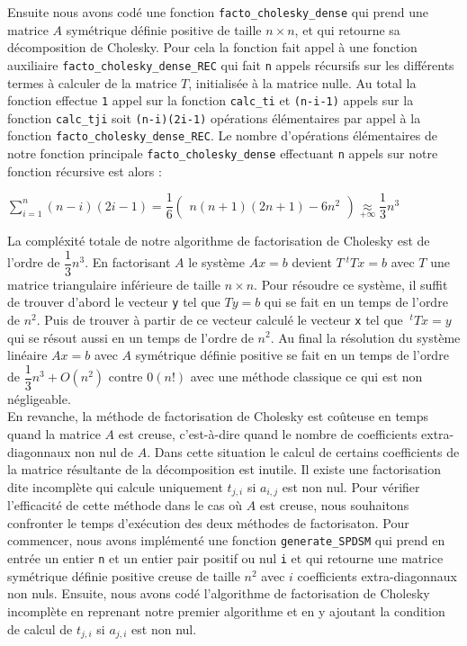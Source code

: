 \documentclass{article}
\begin{document}
Ensuite nous avons codé une fonction \texttt{facto\_cholesky\_dense} qui prend une matrice $A$ symétrique définie positive de taille $n\times n$, et qui retourne sa décomposition de Cholesky. Pour cela la fonction fait appel à une fonction auxiliaire \texttt{facto\_cholesky\_dense\_REC} qui fait \texttt{n} appels récursifs sur les différents termes à calculer de la matrice $T$, initialisée à la matrice nulle. Au total la fonction effectue \texttt{1} appel sur la fonction \texttt{calc\_ti} et \texttt{(n-i-1)} appels sur la fonction \texttt{calc\_tji} soit \texttt{(n-i)(2i-1)} opérations élémentaires par appel à la fonction \texttt{facto\_cholesky\_dense\_REC}. Le nombre d'opérations élémentaires de notre fonction principale \texttt{facto\_cholesky\_dense} effectuant \texttt{n} appels sur notre fonction récursive est alors :
\begin{center}
  $\displaystyle{\sum\limits^{n}_{i=1}(n-i)(2i-1) = \dfrac{1}{6}\begin{pmatrix}n(n+1)(2n+1)-6n^{2}\end{pmatrix} \underset{+\infty}{\approx} \dfrac{1}{3}n^{3}}$
\end{center}
La compléxité totale de notre algorithme de factorisation de Cholesky est de l'ordre de $\dfrac{1}{3}n^{3}$. En factorisant $A$ le système $Ax=b$ devient $T~^tTx=b$ avec $T$ une matrice triangulaire inférieure de taille $n \times n$. Pour résoudre ce système, il suffit de trouver d'abord le vecteur \texttt{y} tel que $Ty=b$ qui se fait en un temps de l'ordre de \texttt{$n^{2}$}. Puis de trouver à partir de ce vecteur calculé le vecteur \texttt{x} tel que $~^{t}Tx=y$ qui se résout aussi en un temps de l'ordre de \texttt{$n^{2}$}. Au final la résolution du système linéaire $Ax=b$ avec $A$ symétrique définie positive se fait en un temps de l'ordre de $\dfrac{1}{3}n^{3}+O(n^{2})$ contre $0(n!)$ avec une méthode classique ce qui est non négligeable.\\

En revanche, la méthode de factorisation de Cholesky est coûteuse en temps quand la matrice $A$ est creuse, c'est-à-dire quand le nombre de coefficients extra-diagonnaux non nul de $A$. Dans cette situation le calcul de certains coefficients de la matrice résultante de la décomposition est inutile. Il existe une factorisation dite incomplète qui calcule uniquement $t_{j,i}$ si $a_{i,j}$ est non nul. Pour vérifier l'efficacité de cette méthode dans le cas où $A$ est creuse, nous souhaitons confronter le temps d'exécution des deux méthodes de factorisaton. Pour commencer, nous avons implémenté une fonction \texttt{generate\_SPDSM} qui prend en entrée un entier \texttt{n} et un entier pair positif ou nul \texttt{i} et qui retourne une matrice symétrique définie positive creuse de taille $n^{2}$ avec $i$ coefficients extra-diagonnaux non nuls. Ensuite, nous avons codé l'algorithme de factorisation de Cholesky incomplète en reprenant notre premier algorithme et en y ajoutant la condition de calcul de $t_{j,i}$ si $a_{j,i}$ est non nul.
\end{document}
